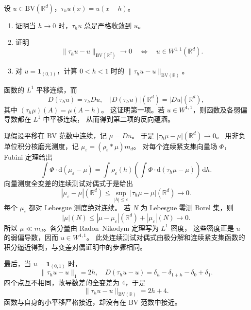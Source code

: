 \begin{optionalexercise}\label{b1:ex:27-translation-bv-norm-characterization}
设 \(u\in \mathrm{BV}(\mathbb R^d)\)，\(\tau_hu(x)=u(x-h)\)。
\begin{enumerate}
 \item\label{b1:item:27-translation-strict}
 证明当 \(h\to0\) 时，\(\tau_hu\) 总是严格收敛到 \(u\)。
 \item\label{b1:item:27-translation-norm}
 证明
 \[
  \|\tau_hu-u\|_{\mathrm{BV}(\mathbb R^d)}\longrightarrow0
    \quad\Longleftrightarrow\quad u\in W^{1,1}(\mathbb R^d).
 \]
 \item\label{b1:item:27-translation-interval}
 对 \(u=\mathbf1_{(0,1)}\)，计算 \(0<h<1\) 时的
 \(\|\tau_hu-u\|_{\mathrm{BV}(\mathbb R)}\)。
\end{enumerate}
\end{optionalexercise}
\begin{solution}
函数的 \(L^1\) 平移连续，而
\[
 D(\tau_hu)=\tau_hDu,\quad
 |D(\tau_hu)|(\mathbb R^d)=|Du|(\mathbb R^d),
\]
其中 \((\tau_h\mu)(A)=\mu(A-h)\)。
这证明第一项。若 \(u\in W^{1,1}\)，则函数及各弱偏导数都在 \(L^1\) 中平移连续，
从而得到第二项的反向蕴涵。

现假设平移在 \(\mathrm{BV}\) 范数中连续，记 \(\mu=Du\)。
于是 \(|\tau_h\mu-\mu|(\mathbb R^d)\to0\)。
用非负单位积分核磨光测度，记
\(\mu_\varepsilon=(\rho_\varepsilon*\mu)m_d\)。
对每个连续紧支集向量场 \(\Phi\)，Fubini 定理给出
\[
 \int\Phi\cdot\mathrm d(\mu_\varepsilon-\mu)
 =\int\rho_\varepsilon(h)
       \left(\int\Phi\cdot\mathrm d(\tau_h\mu-\mu)\right)\,\mathrm dh.
\]
向量测度全变差的连续测试对偶式于是给出
\[
 |\mu_\varepsilon-\mu|(\mathbb R^d)
 \le\sup_{|h|\le\varepsilon}
          |\tau_h\mu-\mu|(\mathbb R^d)\longrightarrow0.
\]
每个 \(\mu_\varepsilon\) 都对 Lebesgue 测度绝对连续。
若 \(N\) 为 Lebesgue 零测 Borel 集，则
\[
 |\mu|(N)\le|\mu-\mu_\varepsilon|(\mathbb R^d)
                     +|\mu_\varepsilon|(N)\longrightarrow0.
\]
所以 \(\mu\ll m_d\)。各分量由 Radon–Nikodym 定理写为 \(L^1\) 密度，
这些密度正是 \(u\) 的弱偏导数，因而 \(u\in W^{1,1}\)。
此处连续测试对偶式由极分解和连续紧支集函数的积分逼近得到，与变差对偶证明中的步骤相同。

最后，当 \(u=\mathbf1_{(0,1)}\) 时，
\[
 \|\tau_hu-u\|_1=2h,\quad
 D(\tau_hu-u)=\delta_h-\delta_{1+h}-\delta_0+\delta_1.
\]
四个点互不相同，故导数差的全变差为 \(4\)，于是
\[
 \|\tau_hu-u\|_{\mathrm{BV}(\mathbb R)}=2h+4.
\]
函数与自身的小平移严格接近，却没有在 \(\mathrm{BV}\) 范数中接近。
\end{solution}

